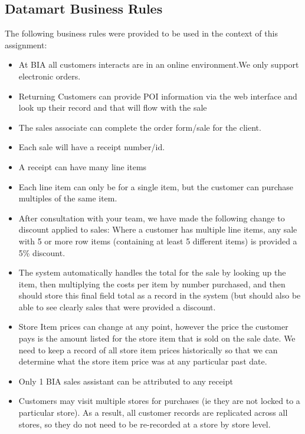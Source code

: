\documentclass{article}
\begin{document}
    \subsection{Datamart Business Rules}
    The following business rules were provided to be used in the context of this assignment:
    \begin{itemize}
        \item At BIA all customers interacts are in an online environment.We only support electronic orders.
        \item Returning Customers can provide POI information via the web interface and look up their record 
        and that will flow with the sale
        \item The sales associate can complete the order form/sale for the client.
        \item Each sale will have a receipt number/id.
        \item A receipt can have many line items 
        \item Each line item can only be for a single item, but the customer can purchase multiples of the same item.
        \item After consultation with your team, we have made the following change to discount applied to sales: 
        Where a customer has multiple line items, any sale with 5 or more row items (containing at least 5 different items) 
        is provided a 5\% discount.
        \item The system automatically handles the total for the sale by looking up the item, then multiplying the costs 
        per item by number purchased, and then should store this final field total as a record in the system (but should
        also be able to see clearly sales that were provided a discount. 
        \item Store Item prices can change at any point, however the price the customer pays is the amount listed for the
        store item that is sold on the sale date. We need to keep a record of all store item prices historically so that 
        we can determine what the store item price was at any particular past date.
        \item Only 1 BIA sales assistant can be attributed to any receipt
        \item Customers may visit multiple stores for purchases (ie they are not locked to a particular store). As a 
        result, all customer records are replicated across all stores, so they do not need to be re-recorded at a 
        store by store level.
    \end{itemize}
   
\end{document}
